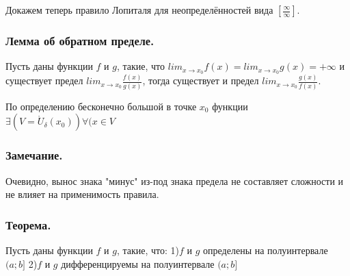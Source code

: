 Докажем теперь правило Лопиталя для неопределённостей вида $\left[\frac{\infty}{\infty}\right].$

\subsubsection{Лемма об обратном пределе.}

Пусть даны функции $f$ и $g$, такие, что $lim_{x \to x_0}f(x)=lim_{x \to x_0}g(x)=+\infty$ и 
существует предел $lim_{x \to x_0} \frac{f(x)}{g(x)}$, 
тогда существует и предел $lim_{x \to x_0} \frac{g(x)}{f(x)}$.

\dokvo

По определению бесконечно большой в точке $x_0$ функции $\exists(V=\mathring{U}_\delta(x_0))\forall(x \in V$

\subsubsection{Замечание.}

Очевидно, вынос знака "минус" из-под знака предела не составляет сложности и не влияет на применимость правила.

\subsubsection{Теорема.}

Пусть даны функции $f$ и $g$, такие, что:
1)$f$ и $g$ определены на полуинтервале $(a;b]$
2)$f$ и $g$ дифференцируемы на полуинтервале $(a;b]$
